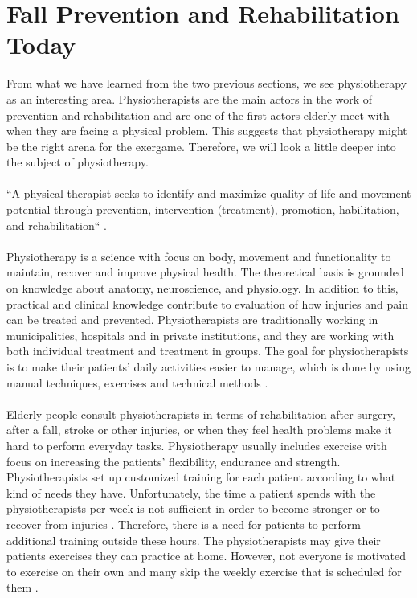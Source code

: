 \section{Fall Prevention and Rehabilitation Today}
From what we have learned from the two previous sections, we see physiotherapy as an interesting area. Physiotherapists are the main actors in the work of prevention and rehabilitation and are one of the first actors elderly meet with when they are facing a physical problem. This suggests that physiotherapy might be the right arena for the exergame. Therefore, we will look a little deeper into the subject of physiotherapy. \\ \\“A physical therapist seeks to identify and maximize quality of life and movement potential through prevention, intervention (treatment), promotion, habilitation, and rehabilitation“ \cite{physiocite}.\\ \\
Physiotherapy is a science with focus on body, movement and functionality to maintain, recover and improve physical health. The theoretical basis is grounded on knowledge about anatomy, neuroscience, and physiology. In addition to this, practical and clinical knowledge contribute to evaluation of how injuries and pain can be treated and prevented. Physiotherapists are traditionally working in municipalities, hospitals and in private institutions, and they are working with both individual treatment and treatment in groups. The goal for physiotherapists is to make their patients' daily activities easier to manage, which is done by using manual techniques, exercises and technical methods \cite{physiotherapy1}\cite{physiotherapy2}.  \\ \\
Elderly people consult physiotherapists in terms of rehabilitation after surgery, after a fall, stroke or other injuries, or when they feel health problems make it hard to perform everyday tasks. Physiotherapy usually includes exercise with focus on increasing the patients’ flexibility, endurance and strength. Physiotherapists set up customized training for each patient according to what kind of needs they have. Unfortunately, the time a patient spends with the physiotherapists per week is not sufficient in order to become stronger or to recover from injuries \cite{gruppetrening-trheim}. Therefore, there is a need for patients to perform additional training outside these hours. The physiotherapists may give their patients exercises they can practice at home. However, not everyone is motivated to exercise on their own and many skip the weekly exercise that is scheduled for them \cite{physiotherapy2}. 



